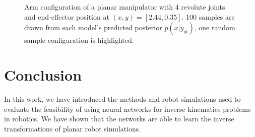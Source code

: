 \documentclass[conference]{IEEEtran}
\begin{document}
\begin{figure}[tbh]
\centering

    \caption{\label{fig:posterior:4dof} Arm configuration of a planar manipulator with 4 revolute joints and end-effector position at $(x, y) = [2.44, 0.35]$. 100 samples are drawn from each model's predicted posterior $\tilde{p}(x | y_{gt})$, one random sample configuration is highlighted.}
\end{figure}

\section*{Conclusion}

In this work, we have introduced the methods and robot simulations used to evaluate the feasibility of using neural networks for inverse kinematics problems in robotics. We have shown that the networks are able to learn the inverse transformations of planar robot simulations.
\end{document}

